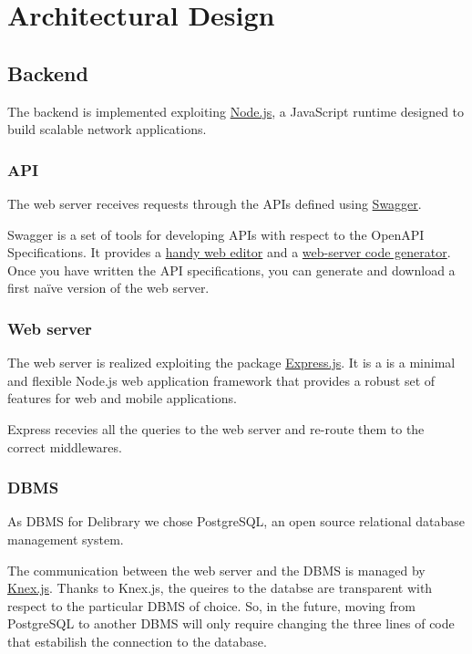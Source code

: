 \chapter{Architectural Design}

\section{Backend}
The backend is implemented exploiting \href{https://nodejs.org}{Node.js}, a JavaScript runtime designed to build scalable network applications.

\subsection{API}
The web server receives requests through the APIs defined using \href{https://swagger.io}{Swagger}.

Swagger is a set of tools for developing APIs with respect to the OpenAPI Specifications.
It provides a \href{https://editor.swagger.io}{handy web editor} and a \href{https://swagger.io/tools/swagger-codegen}{web-server code generator}.
Once you have written the API specifications, you can generate and download a first naïve version of the web server.

\subsection{Web server}
The web server is realized exploiting the package \href{https://expressjs.com}{Express.js}.
It is a is a minimal and flexible Node.js web application framework that provides a robust set of features for web and mobile applications.

Express recevies all the queries to the web server and re-route them to the correct middlewares.

\subsection{DBMS}
As DBMS for Delibrary we chose PostgreSQL, an open source relational database management system.

The communication between the web server and the DBMS is managed by \href{https://knexjs.org}{Knex.js}.
Thanks to Knex.js, the queires to the databse are transparent with respect to the particular DBMS of choice.
So, in the future, moving from PostgreSQL to another DBMS will only require changing the three lines of code that estabilish the connection to the database.

